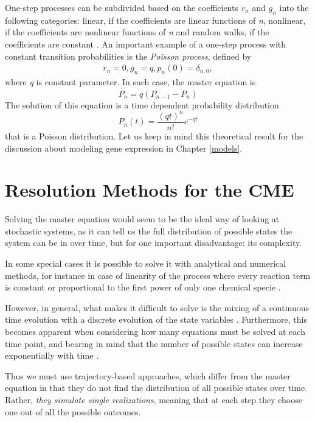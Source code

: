 \documentclass[12pt,a4paper]{report}
\begin{document}
One-step processes can be subdivided based on the coefficients $r_{n}$ and $g_{n}$ into the following categories: linear, if the coefficients are linear functions of \emph{n}, nonlinear, if the coefficients are nonlinear functions of \emph{n} and random walks, if the coefficients are constant \cite{Ragazza,Math}.
\newline
An important example of a one-step process with constant transition probabilities is the \emph{Poisson process}, defined by
\begin{align}
    r_{n} = 0,g_{n}=q,p_{n}(0)=\delta_{n,0},
\end{align}
where \emph{q} is constant parameter. In such case, the master equation is
\begin{equation}
    \dot{P_{n}} = q(P_{n-1}-P_{n})
\end{equation}
The solution of this equation is a time dependent probability distribution
\begin{equation}
    P_{n}(t) = \frac{(qt)^{n}}{n!}e^{-qt}
\end{equation}
that is a Poisson distribution. Let us keep in mind this theoretical result for the discussion about modeling gene expression in Chapter \ref{models}.  

\section{Resolution Methods for the CME}

Solving the master equation would seem to be the ideal way of looking at stochastic systems, as it can tell us the full distribution of possible states the system can be in over time, but for one important disadvantage: its complexity. 

In some special cases it is possible to solve it with analytical and numerical methods, for instance in case of linearity of the process where every reaction term is constant or proportional to the first power of only one chemical specie \cite{PHD}.

However, in general, what makes it difficult to solve is the mixing of a continuous time evolution with a discrete evolution of the state variables \cite{SanDiegoUniversity}. Furthermore, this becomes apparent when considering how many equations must be solved at each time point, and bearing in mind that the number of possible states can increase exponentially with time \cite{Article}. 
 
Thus we must use trajectory-based approaches, which differ from the master equation in that they do not find the distribution of all possible states over time. Rather, \emph{they simulate single realizations}, meaning that at each step they choose one out of all the possible outcomes.
\end{document}

